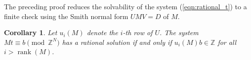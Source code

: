 \documentclass[draft]{adm-paper}
\newtheorem{corollary}[theorem]{Corollary}
\theoremstyle{definition}
\begin{document}
%
%

The preceding proof reduces the solvability of the system (\ref{eqn:rational_t}) to a finite check using the Smith normal form $UMV = D$ of $M$.

\begin{corollary}
Let $u_i(M)$ denote the $i$-th row of $U$. The system $Mt \equiv b \pmod{\mathbb{Z}^N}$ has a rational solution if and only if $u_i(M)b \in \mathbb{Z}$ for all $i > \operatorname{rank}(M)$.
\end{corollary}
%
%
\end{document}
